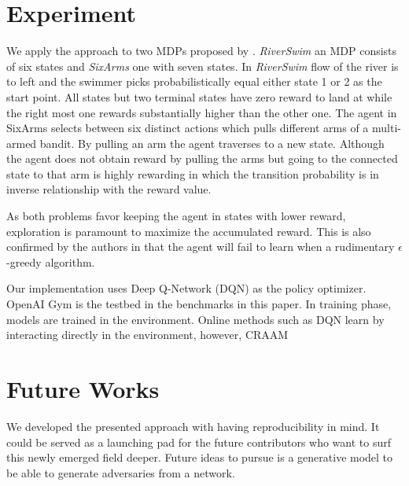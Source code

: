\documentclass{article}
\begin{document}
    \section{Experiment}
    We apply the approach to two MDPs proposed by \cite{Strehl2004AnProcesses}. \textit{RiverSwim} an MDP consists of six states and \textit{SixArms} one with seven states. In \textit{RiverSwim} flow of the river is to left and the swimmer picks probabilistically equal either state 1 or 2 as the start point. All states but two terminal states have zero reward to land at while the right most one rewards substantially higher than the other one. The agent in SixArms selects between six distinct actions which pulls different arms of a multi-armed bandit. By pulling an arm the agent traverses to a new state. Although the agent does not obtain reward by pulling the arms but going to the connected state to that arm is highly rewarding in which the transition probability is in inverse relationship with the reward value.

    As both problems favor keeping the agent in states with lower reward, exploration is paramount to maximize the accumulated reward. This is also confirmed by the authors in \cite{Strehl2004AnProcesses} that the agent will fail to learn when a rudimentary $\epsilon$-greedy algorithm.

    Our implementation uses Deep Q-Network (DQN) \cite{Mnih2015} as the policy optimizer. OpenAI Gym \cite{BrockmanOpenAIGym} is the testbed in the benchmarks in this paper. In training phase, models are trained in the environment. Online methods such as DQN learn by interacting directly in the environment, however, CRAAM




    \section{Future Works}
    We developed the presented approach with having reproducibility in mind. It could be served as a launching pad for the future contributors who want to surf this newly emerged field deeper. Future ideas to pursue is a generative model to be able to generate adversaries from a network.
\end{document}
